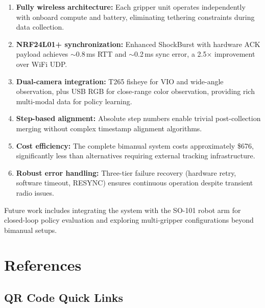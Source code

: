 \documentclass[11pt,a4paper]{article}
\begin{document}
\begin{enumerate}
  \item \textbf{Fully wireless architecture:} Each gripper unit operates independently with onboard compute and battery, eliminating tethering constraints during data collection.

  \item \textbf{NRF24L01+ synchronization:} Enhanced ShockBurst with hardware ACK payload achieves ${\sim}$0.8\,ms RTT and ${\sim}$0.2\,ms sync error, a 2.5$\times$ improvement over WiFi UDP.

  \item \textbf{Dual-camera integration:} T265 fisheye for VIO and wide-angle observation, plus USB RGB for close-range color observation, providing rich multi-modal data for policy learning.

  \item \textbf{Step-based alignment:} Absolute step numbers enable trivial post-collection merging without complex timestamp alignment algorithms.

  \item \textbf{Cost efficiency:} The complete bimanual system costs approximately \$676, significantly less than alternatives requiring external tracking infrastructure.

  \item \textbf{Robust error handling:} Three-tier failure recovery (hardware retry, software timeout, RESYNC) ensures continuous operation despite transient radio issues.
\end{enumerate}

Future work includes integrating the system with the SO-101 robot arm for closed-loop policy evaluation and exploring multi-gripper configurations beyond bimanual setups.


\section{References}

\subsection{QR Code Quick Links}
\end{document}
